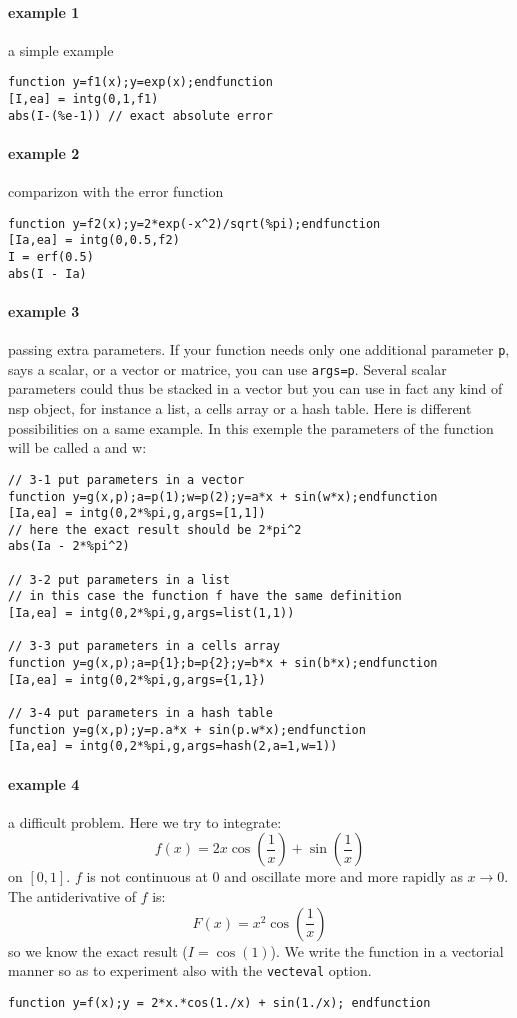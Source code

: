 \begin{examples}
  
\paragraph{example 1} a simple example 
\begin{Verbatim}
function y=f1(x);y=exp(x);endfunction
[I,ea] = intg(0,1,f1)
abs(I-(%e-1)) // exact absolute error
\end{Verbatim}
  
\paragraph{example 2} comparizon with the error function
\begin{Verbatim}
function y=f2(x);y=2*exp(-x^2)/sqrt(%pi);endfunction
[Ia,ea] = intg(0,0.5,f2)
I = erf(0.5)
abs(I - Ia)
\end{Verbatim}
  
\paragraph{example 3} passing extra parameters. If your function needs
only one additional parameter \verb+p+, says a scalar, or a vector or matrice, 
you can use \verb+args=p+. Several scalar parameters could thus be
stacked in a vector but you can use in fact any kind of nsp object,
for instance a list, a cells array or a hash table. Here is different
possibilities on a same example. In this exemple the parameters of
the function will be called a and w:
\begin{Verbatim}
// 3-1 put parameters in a vector
function y=g(x,p);a=p(1);w=p(2);y=a*x + sin(w*x);endfunction
[Ia,ea] = intg(0,2*%pi,g,args=[1,1])
// here the exact result should be 2*pi^2
abs(Ia - 2*%pi^2)

// 3-2 put parameters in a list
// in this case the function f have the same definition
[Ia,ea] = intg(0,2*%pi,g,args=list(1,1))

// 3-3 put parameters in a cells array
function y=g(x,p);a=p{1};b=p{2};y=b*x + sin(b*x);endfunction
[Ia,ea] = intg(0,2*%pi,g,args={1,1})

// 3-4 put parameters in a hash table
function y=g(x,p);y=p.a*x + sin(p.w*x);endfunction
[Ia,ea] = intg(0,2*%pi,g,args=hash(2,a=1,w=1))
\end{Verbatim}

\paragraph{example 4} a difficult problem. Here we try to integrate:
$$
    f(x) = 2 x \cos \left(\frac{1}{x}\right) +  \sin \left(\frac{1}{x}\right)
$$ 
on $[0,1]$. $f$ is not continuous at $0$ and oscillate more and more
rapidly as $x \rightarrow 0$. The antiderivative of $f$
is:
$$
    F(x) = x^2  \cos \left(\frac{1}{x}\right)
$$
so we know the exact result ($I=\cos(1)$). We write the function in a vectorial
manner so as to experiment also with the \verb+vecteval+ option. 
\begin{Verbatim}
function y=f(x);y = 2*x.*cos(1./x) + sin(1./x); endfunction


\end{Verbatim}
\end{examples}

